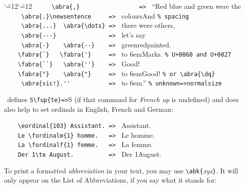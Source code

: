 \documentclass[12pt,a4paper]{article}
\renewcommand{\{}{{\normalfont\lbashortmem}}
\renewcommand{\}}{{\normalfont\rbashortmem}}
\begin{document}
\vspace{.75ex}\noindent
{\small
  \ifnum\catcode`\"=12\else\catcode`\"=12\fi
   \verb|     \abra{,}                 => | ``Red\abra{,} blue and green were the \\[-.25ex]
   \verb|     \abra{.}\newsentence     => | colours\newsentence And \hspace{2.25em} \verb|% spacing| \\[-.25ex]
   \verb|     \abra{...}  \abra{\dots} => | there  were \abra{\dots} others, \\[-.25ex]
   \verb|     \abra{---}               => | \abra{---} let's say \abra{---} \\[-.25ex]
   \verb|     \abra{-}    \abra{--}    => | green\abra{-}red\abra{--}painted. \\[-.25ex]
   \verb|    \fabra{`}   \fabra{'}     => | \hbox to 6em{Marks.\hfill} \verb|% U+0060 and U+0027| \\[-.25ex]
   \verb|    \fabra{``}   \abra{''}    => | Good! \\[-.25ex]
   \verb|    \fabra{"}    \abra{"}     => | \hbox to 6em{Good!\hfill}  \verb|% or \abra{\dq}| \\[-.25ex]
   \verb|     \abra{sic!}.''           => | \hbox to 6em{.''\hfill} \verb|% unknown=>normalsize|}

\vspace{1.5ex}\vfill\noindent 
\BibArts\ defines
\hspace{.1em}\verb|S\fup{te}|\hspace{.3em}\verb|=>|\hspace{.3em}S
(if that command for \textit{French up} is undefined) and does also 
help to set ordinals in English, French and German:

\vspace{.875ex}\vfill\noindent
{\small
  \verb|    \eordinal{103} Assistant. => |  Assistant. \\[-.2ex]
  \verb|    Le \fordinalm{1} homme.   => | Le  homme.   \\[-.25ex]
  \verb|    La \fordinalf{1} femme.   => | La  femme.   \\[-.2ex]
  \verb|    Der 1\te August.          => | Der 1\te August.} 


 \newpage\noindent
 To print a formatted \textit{abbreviation} in your text, you may use 
 \verb|\abk{|\textit{xyz}\verb|}|. It will only appear 
 on the List of Abbreviations, if you say what it stands for:
\end{document}
